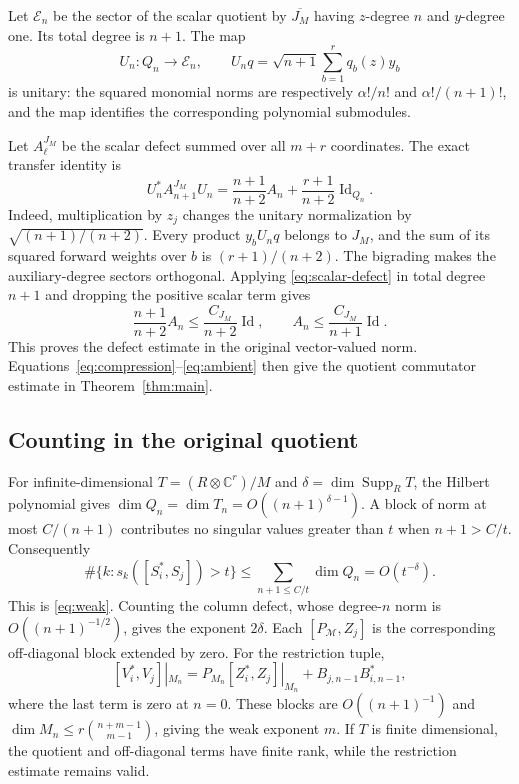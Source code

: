 \documentclass[11pt,reqno]{amsart}
\theoremstyle{remark}
\newcommand{\C}{\mathbb C}
\DeclareMathOperator{\Supp}{Supp}
\DeclareMathOperator{\Id}{Id}
\begin{document}
Let $\mathcal E_n$ be the sector of the scalar quotient by
$\overline{J_M}$ having $z$-degree $n$ and $y$-degree one. Its total
degree is $n+1$. The map
\begin{equation}\label{eq:unitary}
 U_n:Q_n\longrightarrow\mathcal E_n,\qquad
 U_nq=\sqrt{n+1}\sum_{b=1}^r q_b(z)y_b
\end{equation}
is unitary: the squared monomial norms are respectively
$\alpha!/n!$ and $\alpha!/(n+1)!$, and the map identifies the
corresponding polynomial submodules.

Let $A_\ell^{J_M}$ be the scalar defect summed over all $m+r$
coordinates. The exact transfer identity is
\begin{equation}\label{eq:vector-transfer}
 U_n^*A_{n+1}^{J_M}U_n
 =\frac{n+1}{n+2}A_n+\frac{r+1}{n+2}\Id_{Q_n}.
\end{equation}
Indeed, multiplication by $z_j$ changes the unitary normalization by
$\sqrt{(n+1)/(n+2)}$. Every product $y_bU_nq$ belongs to $J_M$,
and the sum of its squared forward weights over $b$ is
$(r+1)/(n+2)$. The bigrading makes the auxiliary-degree sectors
orthogonal. Applying \eqref{eq:scalar-defect} in total degree $n+1$
and dropping the positive scalar term gives
\[
 \frac{n+1}{n+2}A_n\le\frac{C_{J_M}}{n+2}\Id,
 \qquad A_n\le\frac{C_{J_M}}{n+1}\Id.
\]
This proves the defect estimate in the original vector-valued norm.
Equations~\eqref{eq:compression}--\eqref{eq:ambient} then give the
quotient commutator estimate in Theorem~\ref{thm:main}.

\subsection{Counting in the original quotient}
For infinite-dimensional $T=(R\otimes\C^r)/M$ and
$\delta=\dim\Supp_R T$, the Hilbert polynomial gives
$\dim Q_n=\dim T_n=O((n+1)^{\delta-1})$. A block of norm at most
$C/(n+1)$ contributes no singular values greater than $t$ when
$n+1>C/t$. Consequently
\[
 \#\{k:s_k([S_i^*,S_j])>t\}
 \le\sum_{n+1\le C/t}\dim Q_n=O(t^{-\delta}).
\]
This is \eqref{eq:weak}. Counting the column defect, whose
degree-$n$ norm is $O((n+1)^{-1/2})$, gives the exponent $2\delta$.
Each $[P_{\mathcal M},Z_j]$ is the corresponding off-diagonal block
extended by zero. For the restriction tuple,
\[
 [V_i^*,V_j]|_{M_n}
 =P_{M_n}[Z_i^*,Z_j]|_{M_n}+B_{j,n-1}B_{i,n-1}^*,
\]
where the last term is zero at $n=0$. These blocks are
$O((n+1)^{-1})$ and
$\dim M_n\le r\binom{n+m-1}{m-1}$, giving the weak exponent $m$.
If $T$ is finite dimensional, the quotient and off-diagonal terms
have finite rank, while the restriction estimate remains valid.
\end{document}
